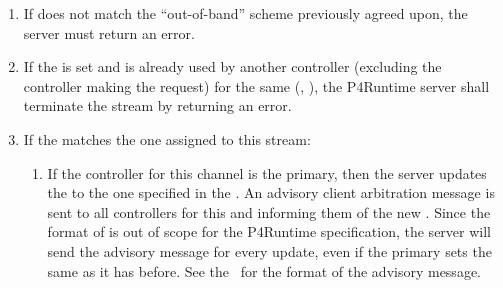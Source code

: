 \documentclass[11pt]{article}
\begin{document}
{\begin{enumerate}
\begin{enumerate}
\item{}
If  does not match the \textquotedblleft{}out-of-band\textquotedblright{} scheme previously
agreed upon, the server must return an  error.%

\item{}
If the  is set and is already used by another controller
(excluding the controller making the request) for the same
(, ), the P4Runtime server shall terminate the stream
by returning an  error.%

\item{}
If the  matches the one assigned to this stream:%

\begin{enumerate}%

\item{}
If the controller for this channel is the primary, then the server
updates the  to the one specified in the
. An advisory client arbitration message is
sent to all controllers for this  and  informing
them of the new .  Since the format of  is
out of scope for the P4Runtime specification, the server will send
the advisory message for every update, even if the primary sets the
same  as it has before. See the~ for the format of the
advisory message.%


\end{enumerate}
\end{enumerate}
\end{enumerate}}
\end{document}
